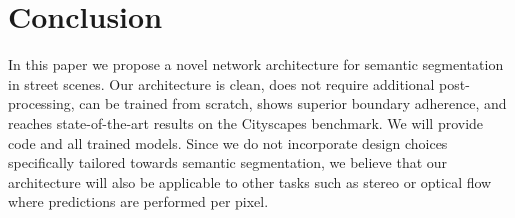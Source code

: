 \documentclass[10pt,twocolumn,letterpaper]{article}
\begin{document}
\section{Conclusion}
\vspace*{-3pt}
In this paper we propose a novel network architecture for semantic segmentation in street scenes. Our architecture is clean, does not require additional post-processing, can be trained from scratch, shows superior boundary adherence, and reaches state-of-the-art results on the Cityscapes benchmark. We will provide code and all trained models. Since we do not incorporate design choices specifically tailored towards semantic segmentation, we believe that our architecture will also be applicable to other tasks such as stereo or optical flow where predictions are performed per pixel.

{\small


}

\clearpage
\end{document}
